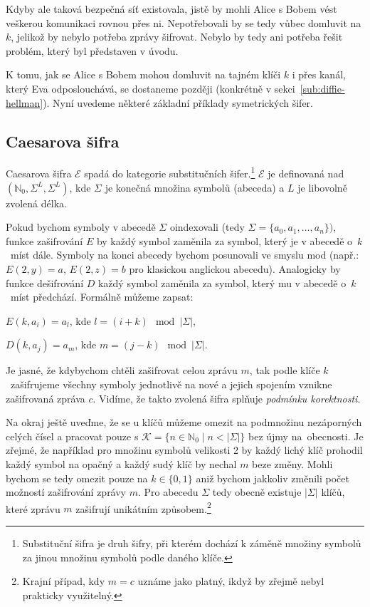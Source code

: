 \documentclass[
  program=infoi,
  biblatex=false,
  figures=true,
  glossaries,
  tables=false,
  sourcecodes=true,
  index
]{kidiplom}
\begin{document}
    Kdyby ale taková bezpečná síť existovala, jistě by mohli Alice s Bobem vést veškerou komunikaci rovnou přes ni.
    Nepotřebovali by se tedy vůbec domluvit na $k$, jelikož
    by nebylo potřeba zprávy šifrovat.
    Nebylo by tedy ani potřeba řešit problém, který byl představen v úvodu.

    K tomu, jak se Alice s Bobem mohou domluvit na tajném klíči $k$ i přes kanál, který 
    Eva odposlouchává, se dostaneme později (konkrétně v sekci~\ref{sub:diffie-hellman}).
    Nyní uvedeme některé základní příklady symetrických šifer.


\subsection{Caesarova šifra}

    Caesarova šifra $\mathcal{E}$ spadá do kategorie substitučních šifer.\footnote{Substituční šifra je druh šifry, při kterém dochází k záměně
    množiny symbolů za jinou množinu symbolů podle daného klíče.}
    $\mathcal{E}$ je definovaná nad $(\mathbb{N}_0,\Sigma^L,\Sigma^L)$, kde $\Sigma$
    je konečná množina symbolů (abeceda) a $L$ je libovolně zvolená délka.

    Pokud bychom symboly v abecedě $\Sigma$ oindexovali (tedy $\Sigma = \{a_0, a_1, \ldots, a_n\})$, funkce
    zašifrování $E$ by každý symbol zaměnila za symbol, který je v abecedě o~$k$~míst dále.
    Symboly na konci abecedy bychom posunovali ve smyslu mod
    (např.: $E(2, y)= a$, $E(2, z)= b$ pro klasickou anglickou abecedu). Analogicky by 
    funkce dešifrování $D$ každý symbol zaměnila za symbol, který mu v abecedě o~$k$~míst předchází.
    Formálně můžeme zapsat:

    \begin{center}
        $E(k, a_i) = a_l$, kde $l = (i+k)\mod{|\Sigma|}$,

        $D(k, a_j) = a_m$, kde $m = (j-k)\mod{|\Sigma|}$.
    \end{center}

    Je jasné, že kdybychom chtěli zašifrovat celou zprávu $m$, tak podle klíče $k$~zašifrujeme všechny symboly jednotlivě na nové a
    jejich spojením vznikne zašifrovaná zpráva $c$.
    Vidíme, že takto zvolená šifra splňuje \emph{podmínku korektnosti}.
    
    Na okraj ještě uveďme, že se u klíčů můžeme omezit na podmnožinu nezáporných celých čísel a pracovat pouze s
    $\mathcal{K} =\{n \in \mathbb{N}_0 \mid n < |\Sigma|\}$
    bez újmy na~obecnosti. Je zřejmé, že například pro množinu symbolů velikosti 2 by každý lichý klíč prohodil
    každý symbol na opačný a každý sudý klíč by nechal $m$ beze změny. Mohli bychom se tedy omezit pouze na $k \in \{0,1\}$
    aniž bychom jakkoliv změnili počet možností zašifrování zprávy $m$.
    Pro abecedu $\Sigma$ tedy obecně existuje $|\Sigma|$ klíčů, které zprávu $m$ zašifrují unikátním způsobem.\footnote{Krajní případ, kdy $m = c$
    uznáme jako platný, ikdyž by zřejmě nebyl prakticky využitelný.}
\end{document}
